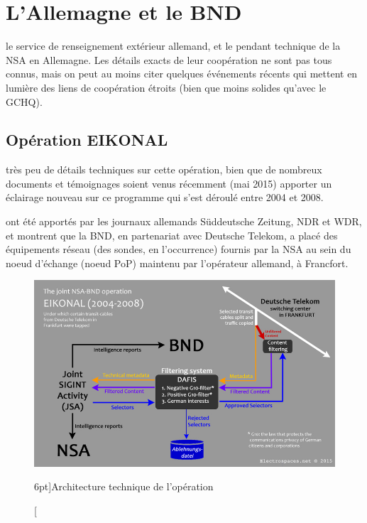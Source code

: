 \newpage
\section{L'Allemagne et le BND}

 le service de
renseignement extérieur allemand, et le pendant technique de la NSA en
Allemagne. Les détails exacts de leur coopération ne sont pas tous connus, mais
on peut au moins citer quelques événements récents qui mettent en lumière des
liens de coopération étroits (bien que moins solides qu'avec le GCHQ).

\subsection{Opération EIKONAL}

 très peu de détails techniques sur cette
opération, bien que de nombreux documents et témoignages soient venus récemment
(mai 2015) apporter un éclairage nouveau sur ce programme qui s'est déroulé entre 2004 et
2008.

 ont été apportés par les journaux allemands
Süddeutsche Zeitung\autocite{sudde}, NDR et WDR\autocite{NDR}, et montrent que la BND,
en partenariat avec Deutsche Telekom, a placé des équipements réseau (des
sondes, en l'occurrence) fournis par la NSA au sein du noeud d'échange (noeud
PoP) maintenu par l'opérateur allemand, à Francfort.

\vspace{0.7cm}
\begin{figure}
\includegraphics{eikonal1.jpg}
\caption[Architecture de l'opération EIKONAL][6pt]{Architecture
technique de l'opération}
\label{fig:eikonal1}
\end{figure}

